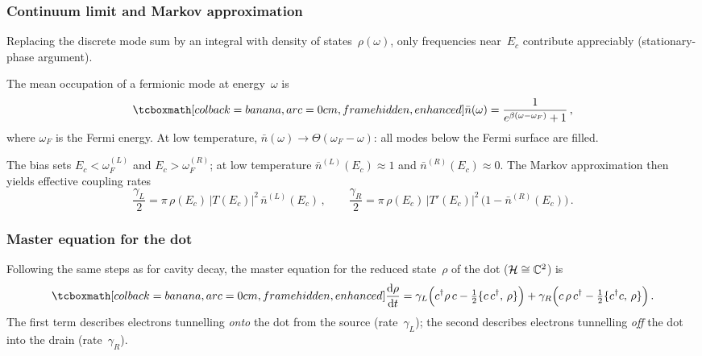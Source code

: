 \subsubsection{Continuum limit and Markov approximation}

Replacing the discrete mode sum by an integral with density of
states~$\rho(\omega)$, only frequencies near~$E_c$ contribute
appreciably (stationary-phase argument).

\begin{keyresult}
  The mean occupation of a fermionic mode at energy~$\omega$ is
  \begin{equation}\label{eq:fermi-dirac}
    \eqbox{\bar{n}(\omega)
    = \frac{1}{e^{\beta(\omega - \omega_F)} + 1}}\,,
  \end{equation}
  where $\omega_F$ is the Fermi energy.  At low temperature,
  $\bar{n}(\omega) \to \Theta(\omega_F - \omega)$: all modes below
  the Fermi surface are filled.
\end{keyresult}

The bias sets $E_c < \omega_F^{(L)}$ and $E_c > \omega_F^{(R)}$;
at low temperature $\bar{n}^{(L)}(E_c) \approx 1$ and
$\bar{n}^{(R)}(E_c) \approx 0$.  The Markov approximation then
yields effective coupling rates
\begin{equation}\label{eq:gamma-rates}
  \frac{\gamma_L}{2}
  = \pi\,\rho(E_c)\,\lvert T(E_c)\rvert^2\,
    \bar{n}^{(L)}(E_c)\,,
  \qquad
  \frac{\gamma_R}{2}
  = \pi\,\rho(E_c)\,\lvert T'(E_c)\rvert^2\,
    \bigl(1 - \bar{n}^{(R)}(E_c)\bigr)\,.
\end{equation}

\subsubsection{Master equation for the dot}

Following the same steps as for cavity decay, the master equation for
the reduced state~$\rho$ of the dot ($\mathcal{H} \cong \mathbb{C}^2$) is
\begin{equation}\label{eq:dot-lindblad}
  \eqbox{\frac{\dd\rho}{\dd t}
  = \gamma_L\Bigl(c^\adj\rho\, c
      - \tfrac{1}{2}\{c\, c^\adj,\,\rho\}\Bigr)
  + \gamma_R\Bigl(c\,\rho\, c^\adj
      - \tfrac{1}{2}\{c^\adj c,\,\rho\}\Bigr)}\,.
\end{equation}
The first term describes electrons tunnelling \emph{onto} the dot
from the source (rate~$\gamma_L$); the second describes electrons
tunnelling \emph{off} the dot into the drain (rate~$\gamma_R$).

